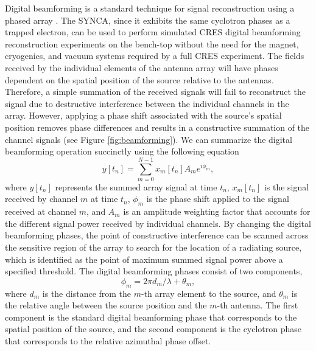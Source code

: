 Digital beamforming is a standard technique for signal reconstruction using a phased array \cite{wirth2001radar}. The SYNCA, since it exhibits the same cyclotron phases as a trapped electron, can be used to perform simulated CRES digital beamforming reconstruction experiments on the bench-top without the need for the magnet, cryogenics, and vacuum systems required by a full CRES experiment. The fields received by the individual elements of the antenna array will have phases dependent on the spatial position of the source relative to the antennas. Therefore, a simple summation of the received signals will fail to reconstruct the signal due to destructive interference between the individual channels in the array. However, applying a phase shift associated with the source's spatial position removes phase differences and results in a constructive summation of the channel signals (see Figure \ref{fig:beamforming}). We can summarize the digital beamforming operation succinctly using the following equation
\begin{equation}
    y[t_n]=\sum_{m=0}^{N-1}x_m[t_n]A_m e^{i\phi_m},
\end{equation}
where $y[t_n]$ represents the summed array signal at time $t_n$, $x_m[t_n]$ is the signal received by channel $m$ at time $t_n$, $\phi_m$ is the phase shift applied to the signal received at channel $m$, and $A_m$ is an amplitude weighting factor that accounts for the different signal power received by individual channels. By changing the digital beamforming phases, the point of constructive interference can be scanned across the sensitive region of the array to search for the location of a radiating source, which is identified as the point of maximum summed signal power above a specified threshold. The digital beamforming phases consist of two components,
\begin{equation}
    \phi_m=2\pi d_m/\lambda+\theta_m,
    \label{eq:beamform-phase}
\end{equation}
where $d_m$ is the distance from the $m$-th array element to the source, and $\theta_m$ is the relative angle between the source position and the $m$-th antenna. The first component is the standard digital beamforming phase that corresponds to the spatial position of the source, and the second component is the cyclotron phase that corresponds to the relative azimuthal phase offset. 


